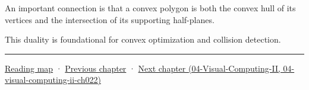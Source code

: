 An important connection is that a convex polygon is both the convex hull of its vertices and the intersection of its supporting half-planes.

This duality is foundational for convex optimization and collision detection.

\begin{center}\rule{0.5\linewidth}{0.5pt}\end{center}

\href{Chapter\%20Edition/02\%20-\%20Graphics\%20Vision\%20and\%20XR/00\%20-\%20Reading\%20Map}{Reading map} · \hyperref[03-visual-computing-i-ch020]{Previous chapter} · \href{}{Next chapter (04-Visual-Computing-II, 04-visual-computing-ii-ch022)}

